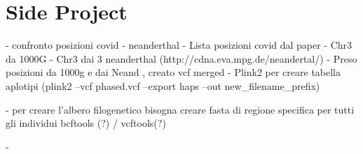 
\chapter{Side Project}


- confronto posizioni covid - neanderthal 
- Lista posizioni covid dal paper
- Chr3 da 1000G 
- Chr3 dai 3 neanderthal (http://cdna.eva.mpg.de/neandertal/)
- Preso posizioni da 1000g e dai Neand , creato vcf merged
- Plink2 per creare tabella aplotipi (plink2 --vcf phased.vcf --export haps --out new\_filename\_prefix) 


- per creare l'albero filogenetico bisogna creare fasta di regione specifica per tutti gli individui 
bcftools (?) / vcftools(?)

- 